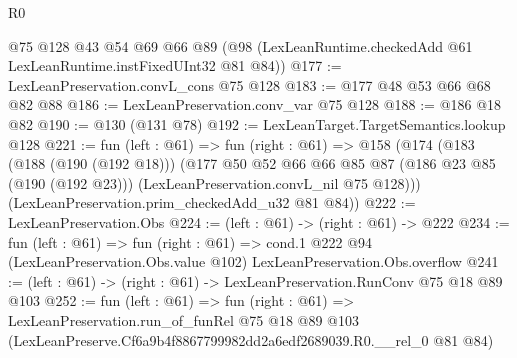 \begin{lexlean}{R0}
\begin{coremodule}
    @75
    @128
    @43
    @54
    @69
    @66
    @89
    (@98 (LexLeanRuntime.checkedAdd @61 LexLeanRuntime.instFixedUInt32 @81 @84))
@177 := LexLeanPreservation.convL_cons @75 @128
@183 := @177 @48 @53 @66 @68 @82 @88
@186 := LexLeanPreservation.conv_var @75 @128
@188 := @186 @18 @82
@190 := @130 (@131 @78)
@192 := LexLeanTarget.TargetSemantics.lookup @128
@221 := fun (left : @61) =>
  fun (right : @61) =>
  @158
    (@174
      (@183
        (@188 (@190 (@192 @18)))
        (@177
          @50
          @52
          @66
          @66
          @85
          @87
          (@186 @23 @85 (@190 (@192 @23)))
          (LexLeanPreservation.convL_nil @75 @128)))
      (LexLeanPreservation.prim_checkedAdd_u32 @81 @84))
@222 := LexLeanPreservation.Obs
@224 := (left : @61) -> (right : @61) -> @222
@234 := fun (left : @61) =>
  fun (right : @61) =>
  cond.{1} @222 @94 (LexLeanPreservation.Obs.value @102) LexLeanPreservation.Obs.overflow
@241 := (left : @61) -> (right : @61) -> LexLeanPreservation.RunConv @75 @18 @89 @103
@252 := fun (left : @61) =>
  fun (right : @61) =>
  LexLeanPreservation.run_of_funRel
    @75
    @18
    @89
    @103
    (LexLeanPreserve.Cf6a9b4f8867799982dd2a6edf2689039.R0.__rel_0 @81 @84)
\end{coremodule}
\end{lexlean}
